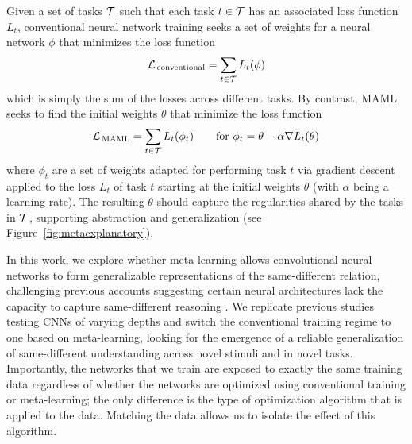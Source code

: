 \documentclass[10pt,letterpaper]{article}
\begin{document}
Given a set of tasks ${\cal T}$ such that each task $t \in {\cal T}$ has an associated loss function ${L}_t$, conventional neural network training seeks a set of weights for a neural network  $\phi$ that minimizes the loss function 
\begin{equation}
{\cal L}_{\rm \, conventional} = \sum_{t \in {\cal T}} { L}_t (\phi) 
\end{equation}
which is simply the sum of the losses across different tasks. By contrast, MAML seeks to find the initial weights $\theta$ that minimize the loss function
\begin{equation}
{\cal L}_{\rm \, MAML} = \sum_{t \in {\cal T}} { L}_t ( \phi_t) \qquad {\rm for} \ \phi_t = \theta - \alpha \nabla { L}_t(\theta) 
\end{equation}
where $\phi_t$ are a set of weights adapted for performing task $t$ via gradient descent applied to the loss $L_t$ of task $t$ starting at the initial weights $\theta$ (with $\alpha$ being a learning rate). The resulting $\theta$ should capture the regularities shared by the tasks in ${\cal T}$, supporting abstraction and generalization (see Figure~\ref{fig:metaexplanatory}).


In this work, we explore whether meta-learning allows convolutional neural networks to form generalizable representations of the same-different relation, challenging previous accounts suggesting certain neural architectures lack the capacity to capture same-different reasoning 
\cite{kim2018not, puebla2022can}. We replicate previous studies testing CNNs of varying depths and switch the conventional training regime to one based on meta-learning, looking for the emergence of a reliable generalization of same-different understanding across novel stimuli and in novel tasks. Importantly, the networks that we train are exposed to exactly the same training data regardless of whether the networks are optimized using conventional training or meta-learning; the only difference is the type of optimization algorithm that is applied to the data. Matching the data allows us to isolate the effect of this algorithm. %
\end{document}
